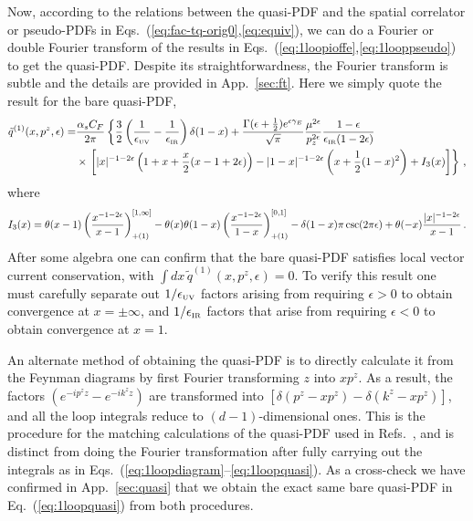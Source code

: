 \documentclass[prd,aps,twocolumn,preprintnumbers,showpacs,nofootinbib,superscriptaddress,notitlepage]{revtex4-1}
\newcommand{\beq}{\begin{eqnarray}}
\newcommand{\eeq}{\end{eqnarray}}
\newcommand{\nn}{\nonumber}
\newcommand{\spcorr}{spatial correlator\xspace}
\DeclareRobustCommand{\app}[1]{App.~\ref{sec:#1}}
\DeclareRobustCommand{\eq}[1]{Eq.~(\ref{eq:#1})}
\DeclareRobustCommand{\app}[1]{App.~\ref{sec:#1}}
\begin{document}
\begin{widetext}
Now, according to the relations between the quasi-PDF and the \spcorr or pseudo-PDFs in Eqs.~(\ref{eq:fac-tq-orig0},\ref{eq:equiv}), we can do a Fourier or double Fourier transform of the results in Eqs.~(\ref{eq:1loopioffe},\ref{eq:1looppseudo}) to get the quasi-PDF. Despite its straightforwardness, the Fourier transform is subtle and the details are provided in \app{ft}. Here we simply quote the result for the bare quasi-PDF,
\begin{align}  \label{eq:1loopquasi}
\tilde{q}^{(1)}(x,p^z,\epsilon)
	=& {\alpha_sC_F\over 2\pi}\left\{{3\over2}\left({1\over \epsilon_{\mbox{\tiny UV}}}-{1\over \epsilon_{\mbox{\tiny IR}}}\right)\delta(1-x) + {\Gamma(\epsilon+{1\over2})e^{\epsilon\gamma_E}\over \sqrt{\pi}}{\mu^{2\epsilon}\over p_z^{2\epsilon}}{1-\epsilon \over \epsilon_{\mbox{\tiny IR}} (1-2\epsilon)} \right.\nn\\
	&\times\left.\left[|x|^{-1-2\epsilon}\left(1+x+{x\over2}(x-1+2\epsilon)\right)-  |1-x|^{-1-2\epsilon}\left(x+{1\over2}(1-x)^2\right) + I_3(x)\right] \right\}\,,
\end{align}
where
\beq
	I_3(x) = \theta(x-1)\left(x^{-1-2\epsilon}\over x-1\right)^{[1,\infty]}_{+(1)} -\theta(x)\theta(1-x) \left(x^{-1-2\epsilon}\over 1-x\right)^{[0,1]}_{+(1)} - \delta(1-x) \pi\csc(2\pi\epsilon) + \theta(-x) {|x|^{-1-2\epsilon}\over x-1}\,.
\eeq
After some algebra one can confirm that the bare quasi-PDF satisfies local vector current conservation, with $\int\! dx\, \tilde{q}^{(1)}(x,p^z,\epsilon) = 0$. To verify this result one must carefully separate out $1/\epsilon_{\mbox{\tiny UV}}$ factors arising from requiring $\epsilon>0$ to obtain convergence at $x=\pm \infty$, and $1/\epsilon_{\mbox{\tiny IR}}$ factors that arise from requiring $\epsilon<0$ to obtain convergence at $x=1$.
	
An alternate method of obtaining the quasi-PDF is to directly calculate it from the Feynman diagrams by first Fourier transforming $z$ into $xp^z$. As a result, the factors $(e^{-ip^z z}- e^{-ik^z z})$ are transformed into $[\delta(p^z-xp^z)-\delta(k^z-xp^z)]$, and all the loop integrals reduce to $(d-1)$-dimensional ones. This is the procedure for the matching calculations of the quasi-PDF used in Refs.~\cite{Xiong:2013bka,Stewart:2017tvs,Wang:2017qyg}, and is distinct from doing the Fourier transformation after fully carrying out the integrals as in Eqs.~(\ref{eq:1loopdiagram}--\ref{eq:1loopquasi}). As a cross-check we have confirmed in \app{quasi} that we obtain the exact same bare quasi-PDF in \eq{1loopquasi} from both procedures.


\end{widetext}
\end{document}
